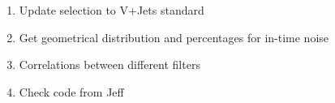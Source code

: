 

\begin{enumerate}
\item Update selection to V+Jets standard
\item Get geometrical distribution and percentages for in-time noise
\item Correlations between different filters
\item Check code from Jeff
\end{enumerate}







